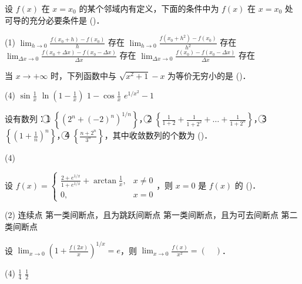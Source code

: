 \documentclass[
  a4paper,
  11pt,
  title in boldface,
  theorem in new line,
  remove problem qed
]{homework}
\begin{document}
\begin{problem}
  设 $f(x)$ 在 $x=x_0$ 的某个邻域内有定义，下面的条件中为 $f(x)$ 在 $x=x_0$ 处可导的充分必要条件是 (\quad)．

  \begin{tasks}(1)
  \task $\lim_{h \to 0} \frac{f(x_0+h) - f(x_0)}{h}$ 存在
  \task $\lim_{h \to 0} \frac{f(x_0+h^2) - f(x_0)}{h^2}$ 存在
  \task $\lim_{\Delta x \to 0} \frac{f(x_0+\Delta x) - f(x_0-\Delta x)}{\Delta x}$ 存在
  \task $\lim_{\Delta x \to 0} \frac{f(x_0) - f(x_0-\Delta x)}{\Delta x}$ 存在
\end{tasks}
\end{problem}

\begin{problem}
  当 $x \to +\infty$ 时，下列函数中与 $\sqrt{x^2+1}-x$ 为等价无穷小的是 (\quad)．

  \begin{tasks}(4)
  \task $\sin \frac{1}{x}$
  \task $\ln (1-\frac{1}{x})$
  \task $1-\cos \frac{1}{x}$
  \task $e^{1/x^2}-1$
\end{tasks}
\end{problem}

\begin{problem}
  设有数列：\textcircled{\scriptsize 1} $\left\{ (2^n+(-2)^n)^{1/n} \right\}$，\textcircled{\scriptsize 2} $\left\{ \frac{1}{1+2} + \frac{1}{1+2^2} + \dots + \frac{1}{1+2^n} \right\}$，\textcircled{\scriptsize 3} $\left\{ (1+\frac{1}{n})^n \right\}$，\textcircled{\scriptsize 4} $\left\{ \frac{n+2^n}{3^n} \right\}$，其中收敛数列的个数为 (\quad)．

  \begin{tasks}(4)
\end{tasks}
\end{problem}

\begin{problem}
  设 $f(x) = \begin{cases} \frac{2+e^{1/x}}{1+e^{1/x}} + \arctan \frac{1}{x}, & x \ne 0 \\ 0, & x=0 \end{cases}$，则 $x=0$ 是 $f(x)$ 的 (\quad)．

  \begin{tasks}(2)
  \task 连续点
  \task 第一类间断点，且为跳跃间断点
  \task 第一类间断点，且为可去间断点
  \task 第二类间断点
\end{tasks}
\end{problem}

\begin{problem}
  设 $\lim_{x \to 0} \left( 1+\frac{f(2x)}{x} \right)^{1/x} = e$，则 $\lim_{x \to 0} \frac{f(x)}{x^2} = (\quad)$．

  \begin{tasks}(4)
  \task $\frac{1}{4}$
  \task $\frac{1}{2}$
\end{tasks}
\end{problem}
\end{document}
